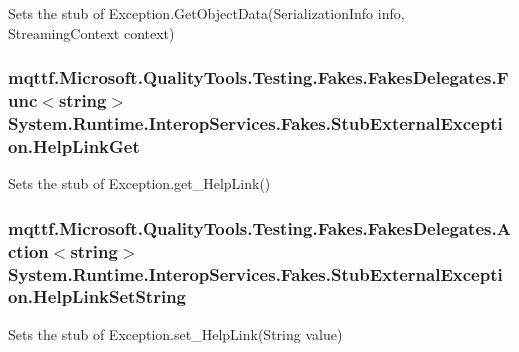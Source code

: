 Sets the stub of Exception.\-Get\-Object\-Data(\-Serialization\-Info info, Streaming\-Context context)

\hypertarget{class_system_1_1_runtime_1_1_interop_services_1_1_fakes_1_1_stub_external_exception_a7984ee96eef84600e84c70717944dba7}{
\subsubsection[{Help\-Link\-Get}]{\setlength{\rightskip}{0pt plus 5cm}mqttf.\-Microsoft.\-Quality\-Tools.\-Testing.\-Fakes.\-Fakes\-Delegates.\-Func$<$string$>$ System.\-Runtime.\-Interop\-Services.\-Fakes.\-Stub\-External\-Exception.\-Help\-Link\-Get}}\label{class_system_1_1_runtime_1_1_interop_services_1_1_fakes_1_1_stub_external_exception_a7984ee96eef84600e84c70717944dba7}


Sets the stub of Exception.\-get\-\_\-\-Help\-Link()

\hypertarget{class_system_1_1_runtime_1_1_interop_services_1_1_fakes_1_1_stub_external_exception_a16e89ace4a961c2bc79591bb8caaf255}{
\subsubsection[{Help\-Link\-Set\-String}]{\setlength{\rightskip}{0pt plus 5cm}mqttf.\-Microsoft.\-Quality\-Tools.\-Testing.\-Fakes.\-Fakes\-Delegates.\-Action$<$string$>$ System.\-Runtime.\-Interop\-Services.\-Fakes.\-Stub\-External\-Exception.\-Help\-Link\-Set\-String}}\label{class_system_1_1_runtime_1_1_interop_services_1_1_fakes_1_1_stub_external_exception_a16e89ace4a961c2bc79591bb8caaf255}


Sets the stub of Exception.\-set\-\_\-\-Help\-Link(\-String value)

